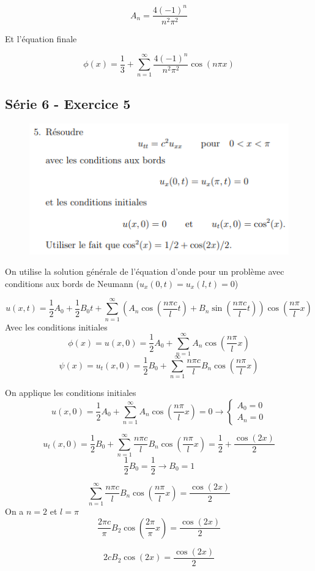 \documentclass[resume]{subfiles}
\begin{document}
\begin{multicols}{2}
$$A_n=\frac{4(-1)^n}{n^2\pi^2}$$

Et l'équation finale

$$\boxed{\phi(x)=\frac{1}{3}+\sum_{n=1}^{\infty}\frac{4(-1)^n}{n^2\pi^2}\cos(n\pi x)}$$
\subsection{Série 6 - Exercice 5}
\label{S6E5}
\begin{figure}[H]
\centering
\includegraphics[scale=0.5]{img_16.png}
\end{figure}
On utilise la solution générale de l'équation d'onde pour un problème avec conditions aux bords de Neumann ($u_x(0,t)=u_x(l,t)=0$)

$$u(x,t)=\frac{1}{2}A_0+\frac{1}{2}B_0t+\sum_{n=1}^{\infty}\left(A_n\cos\left(\frac{n\pi c}{l}t\right)+B_n\sin\left(\frac{n\pi c}{l}t\right)\right)\cos\left(\frac{n\pi}{l}x\right)$$
Avec les conditions initiales
$$\phi(x)=u(x,0)=\frac{1}{2}A_0+\sum_{n=1}^{\infty}A_n\cos\left(\frac{n\pi}{l}x\right)$$
$$\psi(x)=u_t(x,0)=\frac{1}{2}B_0+\sum_{n=1}^{\infty}\frac{n\pi c}{l}B_n\cos\left(\frac{n\pi}{l}x\right)$$

On applique les conditions initiales
$$u(x,0)=\frac{1}{2}A_0+\sum_{n=1}^{\infty}A_n\cos\left(\frac{n\pi}{l}x\right)=0\longrightarrow \boxed{\begin{cases}A_0=0\\A_n=0\end{cases}}$$

$$u_t(x,0)=\frac{1}{2}B_0+\sum_{n=1}^{\infty}\frac{n\pi c}{l}B_n\cos\left(\frac{n\pi}{l}x\right)=\frac{1}{2}+\frac{\cos(2x)}{2}$$
$$\frac{1}{2}B_0=\frac{1}{2}\longrightarrow\boxed{B_0=1}$$

$$\sum_{n=1}^{\infty}\frac{n\pi c}{l}B_n\cos\left(\frac{n\pi}{l}x\right)=\frac{\cos(2x)}{2}$$
On a $n=2$ et $l=\pi$
$$\frac{2\pi c}{\pi}B_2\cos\left(\frac{2\pi}{\pi}x\right)=\frac{\cos(2x)}{2}$$

$$2cB_2\cos\left(2x\right)=\frac{\cos(2x)}{2}$$


\end{multicols}
\end{document}
